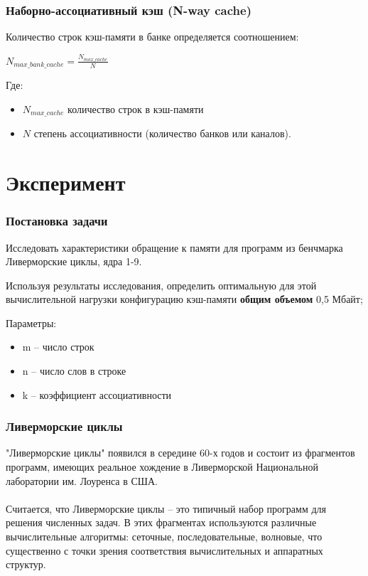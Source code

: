 \documentclass{beamer}
\begin{document}

\begin{frame}
\frametitle{Наборно-ассоциативный кэш (N-way cache)}

Количество строк кэш-памяти в банке определяется соотношением:

\begin{center}
$N_{max\_bank\_cache} = \frac{N_{max\_cache}}{N}$
\end{center}

Где:
\begin{itemize}
\item $N_{max\_cache}$ количество строк в кэш-памяти
\item $N$ степень ассоциативности (количество банков или каналов).
\end{itemize}

\end{frame}

\section{Эксперимент}

\begin{frame}
\frametitle{Постановка задачи}
Исследовать характеристики обращение к памяти для программ из бенчмарка Ливерморские циклы, ядра 1-9.

Используя результаты исследования, определить оптимальную для этой вычислительной нагрузки конфигурацию кэш-памяти \textbf{общим объемом} 0,5 Мбайт;

Параметры:
\begin{itemize}
\item m -- число строк
\item n -- число слов в строке
\item k -- коэффициент ассоциативности
\end{itemize}
\end{frame}


\begin{frame}
\frametitle{Ливерморские циклы}
"Ливерморские циклы" появился в середине 60-х годов и состоит из фрагментов программ, имеющих реальное хождение в Ливерморской Национальной лаборатории им. Лоуренса в США.\\~\\

Считается, что Ливерморские циклы -- это типичный набор программ для решения численных задач. В этих фрагментах используются различные вычислительные алгоритмы: сеточные, последовательные, волновые, что существенно с точки зрения соответствия вычислительных и аппаратных структур.
\end{frame}
\end{document}
